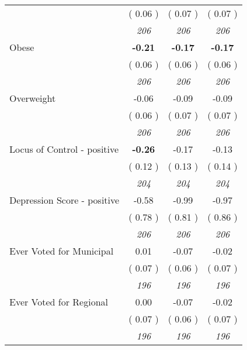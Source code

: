 \begin{tabular}{l c c c}
& (     0.06 ) & (     0.07 ) & (     0.07 ) \\
& \textit{ 206 } & \textit{ 206 } & \textit{ 206 } \\
Obese & \textbf{     -0.21 } & \textbf{     -0.17 } & \textbf{     -0.17 } \\
& (     0.06 ) & (     0.06 ) & (     0.06 ) \\
& \textit{ 206 } & \textit{ 206 } & \textit{ 206 } \\
Overweight &     -0.06 &     -0.09 &     -0.09 \\
& (     0.06 ) & (     0.07 ) & (     0.07 ) \\
& \textit{ 206 } & \textit{ 206 } & \textit{ 206 } \\
Locus of Control - positive & \textbf{     -0.26 } &     -0.17 &     -0.13 \\
& (     0.12 ) & (     0.13 ) & (     0.14 ) \\
& \textit{ 204 } & \textit{ 204 } & \textit{ 204 } \\
Depression Score - positive &     -0.58 &     -0.99 &     -0.97 \\
& (     0.78 ) & (     0.81 ) & (     0.86 ) \\
& \textit{ 206 } & \textit{ 206 } & \textit{ 206 } \\
Ever Voted for Municipal &      0.01 &     -0.07 &     -0.02 \\
& (     0.07 ) & (     0.06 ) & (     0.07 ) \\
& \textit{ 196 } & \textit{ 196 } & \textit{ 196 } \\
Ever Voted for Regional &      0.00 &     -0.07 &     -0.02 \\
& (     0.07 ) & (     0.06 ) & (     0.07 ) \\
& \textit{ 196 } & \textit{ 196 } & \textit{ 196 } \\
\bottomrule
\end{tabular}
